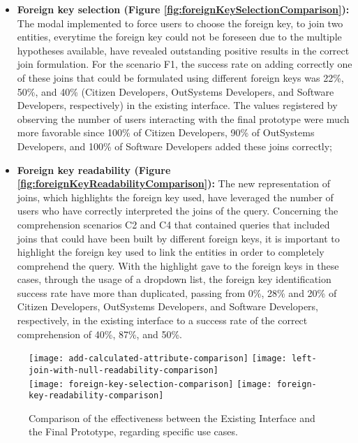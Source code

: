 \begin{itemize}
  \item \textbf{Foreign key selection (Figure \ref{fig:foreignKeySelectionComparison}): } The modal implemented to force users to choose the foreign key, to join two entities, everytime the foreign key could not be foreseen due to the multiple hypotheses available, have revealed outstanding positive results in the correct join formulation. For the scenario F1, the success rate on adding correctly one of these joins that could be formulated using different foreign keys was 22\%, 50\%, and 40\% (Citizen Developers, OutSystems Developers, and Software Developers, respectively) in the existing interface. The values registered by observing the number of users interacting with the final prototype were much more favorable since 100\% of Citizen Developers, 90\% of OutSystems Developers, and 100\% of Software Developers added these joins correctly;
  \item \textbf{Foreign key readability (Figure \ref{fig:foreignKeyReadabilityComparison}): } The new representation of joins, which highlights the foreign key used, have leveraged the number of users who have correctly interpreted the joins of the query. Concerning the comprehension scenarios C2 and C4 that contained queries that included joins that could have been built by different foreign keys, it is important to highlight the foreign key used to link the entities in order to completely comprehend the query. With the highlight gave to the foreign keys in these cases, through the usage of a dropdown list, the foreign key identification success rate have more than duplicated, passing from 0\%, 28\% and 20\% of Citizen Developers, OutSystems Developers, and Software Developers, respectively, in the existing interface to a success rate of the correct comprehension of 40\%, 87\%, and 50\%.
\end{itemize}

\begin{figure}[tb]
  \centering
    {\texttt{[image: add-calculated-attribute-comparison]}}%
    {\texttt{[image: left-join-with-null-readability-comparison]}}%
    \\
  {\texttt{[image: foreign-key-selection-comparison]}}%
  {\texttt{[image: foreign-key-readability-comparison]}}%
  \caption{Comparison of the effectiveness between the Existing Interface and the Final Prototype, regarding specific use cases.}
  \label{fig:specificComparisons}
\end{figure}

